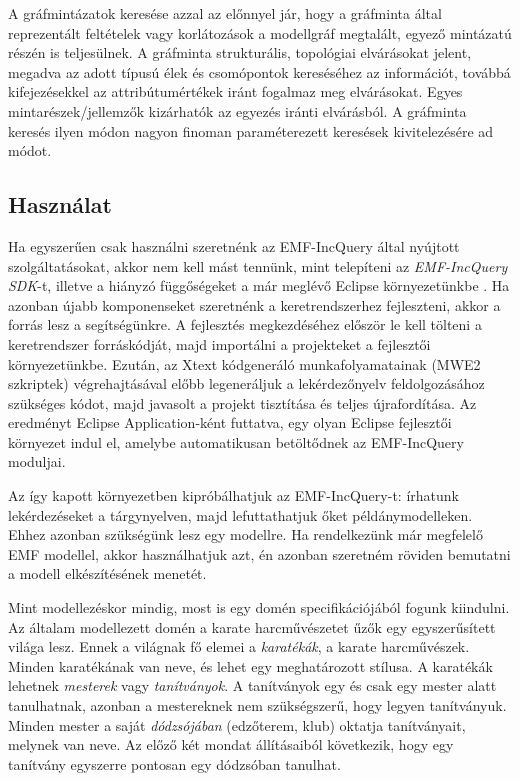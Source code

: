 A gráfmintázatok keresése azzal az előnnyel jár, hogy a gráfminta által reprezentált feltételek vagy korlátozások a modellgráf megtalált, egyező mintázatú részén is teljesülnek.
A gráfminta strukturális, topológiai elvárásokat jelent, megadva az adott típusú élek és csomópontok kereséséhez az információt, továbbá kifejezésekkel az attribútumértékek iránt fogalmaz meg elvárásokat.
Egyes mintarészek/jellemzők kizárhatók az egyezés iránti elvárásból.
A gráfminta keresés ilyen módon nagyon finoman paraméterezett keresések kivitelezésére ad módot.

\subsection{Használat}

Ha egyszerűen csak használni szeretnénk az EMF-IncQuery által nyújtott szolgáltatásokat, akkor nem kell mást tennünk, mint telepíteni az \emph{EMF-IncQuery SDK}-t, illetve a hiányzó függőségeket a már meglévő Eclipse környezetünkbe \cite{EclipseOrgIncQueryInstall}.
Ha azonban újabb komponenseket szeretnénk a keretrendszerhez fejleszteni, akkor a \cite{EclipseOrgIncQueryDevEnv} forrás lesz a segítségünkre.
A fejlesztés megkezdéséhez először le kell tölteni a keretrendszer forráskódját, majd importálni a projekteket a fejlesztői környezetünkbe.
Ezután, az Xtext kódgeneráló munkafolyamatainak (MWE2 szkriptek) végrehajtásával előbb legeneráljuk a lekérdezőnyelv feldolgozásához szükséges kódot, majd javasolt a projekt tisztítása és teljes újrafordítása.
Az eredményt Eclipse Application-ként futtatva, egy olyan Eclipse fejlesztői környezet indul el, amelybe automatikusan betöltődnek az EMF-IncQuery moduljai.

Az így kapott környezetben kipróbálhatjuk az EMF-IncQuery-t: írhatunk lekérdezéseket a tárgynyelven, majd lefuttathatjuk őket példánymodelleken.
Ehhez azonban szükségünk lesz egy modellre.
Ha rendelkezünk már megfelelő \gls{EMF} modellel, akkor használhatjuk azt, én azonban szeretném röviden bemutatni a modell elkészítésének menetét.

Mint modellezéskor mindig, most is egy domén specifikációjából fogunk kiindulni.
Az általam modellezett domén a karate harcművészetet űzők egy egyszerűsített világa lesz.
Ennek a világnak fő elemei a \emph{karatékák}, a karate harcművészek.
Minden karatékának van neve, és lehet egy meghatározott stílusa.
A karatékák lehetnek \emph{mesterek} vagy \emph{tanítványok}.
A tanítványok egy és csak egy mester alatt tanulhatnak, azonban a mestereknek nem szükségszerű, hogy legyen tanítványuk.
Minden mester a saját \emph{dódzsójában} (edzőterem, klub) oktatja tanítványait, melynek van neve.
Az előző két mondat állításaiból következik, hogy egy tanítvány egyszerre pontosan egy dódzsóban tanulhat.

